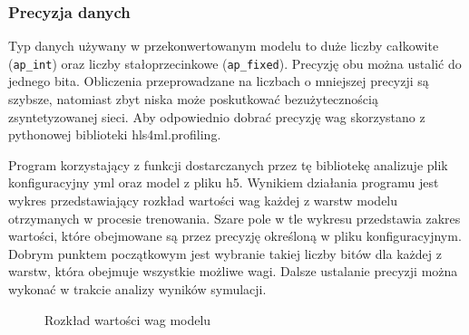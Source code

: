 \documentclass[12pt, oneside, a4paper]{article}
\begin{document}
\subsubsection{Precyzja danych}
Typ danych używany w przekonwertowanym modelu to duże liczby całkowite
(\lstinline{ap_int}) oraz liczby stałoprzecinkowe (\lstinline{ap_fixed}).
Precyzję obu można ustalić do jednego bita.
Obliczenia przeprowadzane na liczbach o mniejszej
precyzji są szybsze, natomiast zbyt niska może poskutkować
bezużytecznością zsyntetyzowanej sieci. Aby odpowiednio dobrać precyzję
wag skorzystano z pythonowej biblioteki hls4ml.profiling.

Program korzystający z funkcji dostarczanych przez tę bibliotekę
analizuje plik konfiguracyjny yml oraz model z pliku h5.
Wynikiem działania programu jest wykres przedstawiający
rozkład wartości wag każdej z warstw modelu otrzymanych w procesie trenowania.
Szare pole w tle wykresu
przedstawia zakres wartości, które obejmowane są przez precyzję określoną
w pliku konfiguracyjnym. Dobrym punktem początkowym jest wybranie takiej
liczby bitów dla każdej z warstw, która obejmuje wszystkie możliwe wagi.
Dalsze ustalanie precyzji można wykonać w trakcie analizy wyników
symulacji.
\begin{figure}[H]
  \caption{Rozkład wartości wag modelu}\label{fig:weights_dist}
  
  \centering
\end{figure}
\end{document}
